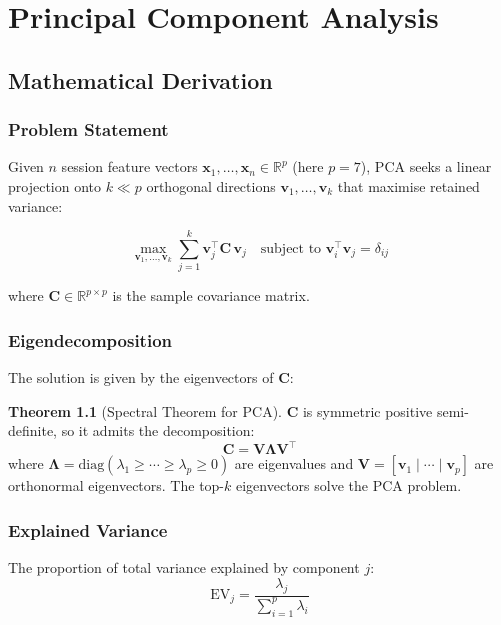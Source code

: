 \documentclass[12pt,a4paper]{report}
\newcommand{\R}{\mathbb{R}}
\newcommand{\mat}[1]{\mathbf{#1}}
\newcommand{\vect}[1]{\bm{#1}}
\theoremstyle{definition}
\newtheorem{theorem}{Theorem}[chapter]
\begin{document}
\chapter{Principal Component Analysis}

\section{Mathematical Derivation}

\subsection{Problem Statement}

Given $n$ session feature vectors $\vect{x}_1, \ldots, \vect{x}_n \in \R^p$
(here $p = 7$), PCA seeks a linear projection onto $k \ll p$ orthogonal
directions $\vect{v}_1, \ldots, \vect{v}_k$ that maximise retained variance:

\[
  \max_{\vect{v}_1, \ldots, \vect{v}_k} \sum_{j=1}^{k} \vect{v}_j^\top \mat{C}\, \vect{v}_j
  \quad \text{subject to } \vect{v}_i^\top \vect{v}_j = \delta_{ij}
\]

where $\mat{C} \in \R^{p \times p}$ is the sample covariance matrix.

\subsection{Eigendecomposition}

The solution is given by the eigenvectors of $\mat{C}$:

\begin{theorem}[Spectral Theorem for PCA]
$\mat{C}$ is symmetric positive semi-definite, so it admits the decomposition:
\[
  \mat{C} = \mat{V}\mat{\Lambda}\mat{V}^\top
\]
where $\mat{\Lambda} = \mathrm{diag}(\lambda_1 \geq \cdots \geq \lambda_p \geq 0)$
are eigenvalues and $\mat{V} = [\vect{v}_1 \mid \cdots \mid \vect{v}_p]$ are
orthonormal eigenvectors. The top-$k$ eigenvectors solve the PCA problem.
\end{theorem}

\subsection{Explained Variance}

The proportion of total variance explained by component $j$:
\[
  \text{EV}_j = \frac{\lambda_j}{\sum_{i=1}^{p} \lambda_i}
\]
\end{document}
